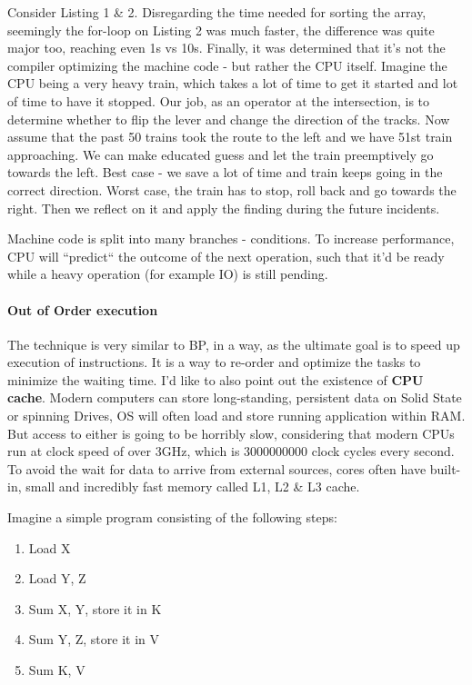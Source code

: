 \documentclass{article}
\begin{document}
Consider Listing 1 \& 2. Disregarding the time needed for sorting the array, seemingly the for-loop on Listing 2 was much faster, the difference was quite major too, reaching even 1s vs 10s. Finally, it was determined that it's not the compiler optimizing the machine code - but rather the CPU itself. Imagine the CPU being a very heavy train, which takes a lot of time to get it started and lot of time to have it stopped. Our job, as an operator at the intersection, is to determine whether to flip the lever and change the direction of the tracks. Now assume that the past 50 trains took the route to the left and we have 51st train approaching. We can make educated guess and let the train preemptively go towards the left. Best case - we save a lot of time and train keeps going in the correct direction. Worst case, the train has to stop, roll back and go towards the right. Then we reflect on it and apply the finding during the future incidents.

Machine code is split into many branches - conditions. To increase performance, CPU will ``predict`` the outcome of the next operation, such that it'd be ready while a heavy operation (for example IO) is still pending.

\paragraph{Out of Order execution}
The technique is very similar to BP, in a way, as the ultimate goal is to speed up execution of instructions. It is a way to re-order and optimize the tasks to minimize the waiting time. I'd like to also point out the existence of \textbf{CPU cache}. Modern computers can store long-standing, persistent data on Solid State or spinning Drives, OS will often load and store running application within RAM. But access to either is going to be horribly slow, considering that modern CPUs run at clock speed of over 3GHz, which is 3000000000 clock cycles every second. To avoid the wait for data to arrive from external sources, cores often have built-in, small and incredibly fast memory called L1, L2 \& L3 cache.

Imagine a simple program consisting of the following steps:
\begin{enumerate}
  \item Load X
  \item Load Y, Z
  \item Sum X, Y, store it in K
  \item Sum Y, Z, store it in V
  \item Sum K, V
\end{enumerate}
\end{document}
